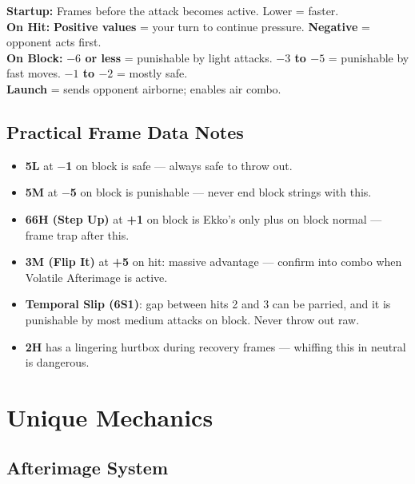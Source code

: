 \documentclass[12pt, a4paper]{report}
\newcommand{\movename}[1]{\textbf{\textcolor{ekkoGold}{#1}}}
\newcommand{\advantage}[1]{\textcolor{ekkoGreen}{\textbf{#1}}}
\newcommand{\disadvantage}[1]{\textcolor{ekkoRed}{\textbf{#1}}}
\begin{document}
\begin{tipbox}
\textbf{Startup:} Frames before the attack becomes active. Lower = faster.\\[0.3em]
\textbf{On Hit:} \advantage{Positive values} = your turn to continue pressure. \disadvantage{Negative} = opponent acts first.\\[0.3em]
\textbf{On Block:} \disadvantage{$-6$ or less} = punishable by light attacks. \disadvantage{$-3$ to $-5$} = punishable by fast moves. \disadvantage{$-1$ to $-2$} = mostly safe.\\[0.3em]
\textbf{Launch} = sends opponent airborne; enables air combo.
\end{tipbox}

\section{Practical Frame Data Notes}

\begin{itemize}
  \item \movename{5L} at \disadvantage{$-$1} on block is safe --- always safe to throw out.
  \item \movename{5M} at \disadvantage{$-$5} on block is punishable --- never end block strings with this.
  \item \movename{66H (Step Up)} at \advantage{+1} on block is Ekko's only plus on block normal --- frame trap after this.
  \item \movename{3M (Flip It)} at \advantage{+5} on hit: massive advantage --- confirm into combo when Volatile Afterimage is active.
  \item \movename{Temporal Slip (6S1)}: gap between hits 2 and 3 can be parried, and it is punishable by most medium attacks on block. Never throw out raw.
  \item \movename{2H} has a lingering hurtbox during recovery frames --- whiffing this in neutral is dangerous.
\end{itemize}

\chapter{Unique Mechanics}

\section{Afterimage System}
\end{document}
